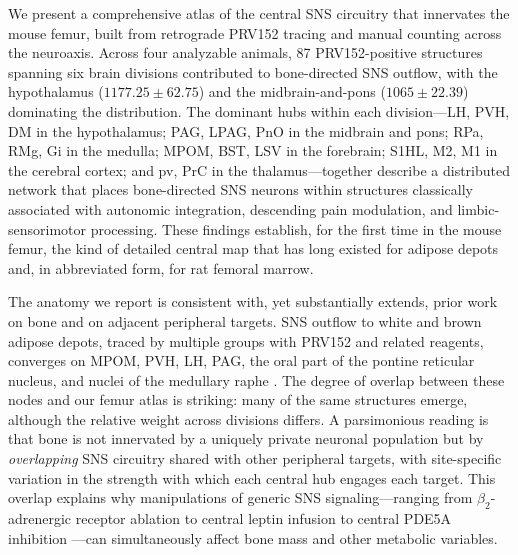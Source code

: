 \documentclass[11pt]{article}
\begin{document}
We present a comprehensive atlas of the central SNS circuitry that innervates the mouse femur, built from retrograde PRV152 tracing and manual counting across the neuroaxis. Across four analyzable animals, 87 PRV152-positive structures spanning six brain divisions contributed to bone-directed SNS outflow, with the hypothalamus ($1177.25 \pm 62.75$) and the midbrain-and-pons ($1065 \pm 22.39$) dominating the distribution. The dominant hubs within each division---LH, PVH, DM in the hypothalamus; PAG, LPAG, PnO in the midbrain and pons; RPa, RMg, Gi in the medulla; MPOM, BST, LSV in the forebrain; S1HL, M2, M1 in the cerebral cortex; and pv, PrC in the thalamus---together describe a distributed network that places bone-directed SNS neurons within structures classically associated with autonomic integration, descending pain modulation, and limbic-sensorimotor processing. These findings establish, for the first time in the mouse femur, the kind of detailed central map that has long existed for adipose depots and, in abbreviated form, for rat femoral marrow.

The anatomy we report is consistent with, yet substantially extends, prior work on bone and on adjacent peripheral targets. SNS outflow to white and brown adipose depots, traced by multiple groups with PRV152 and related reagents, converges on MPOM, PVH, LH, PAG, the oral part of the pontine reticular nucleus, and nuclei of the medullary raphe \citep{bamshad1998central,bamshad1999cns,bartness1998innervation,bartness2014neural,ryu2014short,song2008mc4r,shrestha2010central,brito2007differential,adler2012neurochemical}. The degree of overlap between these nodes and our femur atlas is striking: many of the same structures emerge, although the relative weight across divisions differs. A parsimonious reading is that bone is not innervated by a uniquely private neuronal population but by \emph{overlapping} SNS circuitry shared with other peripheral targets, with site-specific variation in the strength with which each central hub engages each target. This overlap explains why manipulations of generic SNS signaling---ranging from \(\beta_2\)-adrenergic receptor ablation \citep{takeda2002leptin,elefteriou2005leptin} to central leptin infusion \citep{ducy2000leptin,flak2016cns} to central PDE5A inhibition \citep{kim2020pde5a}---can simultaneously affect bone mass and other metabolic variables.
\end{document}
